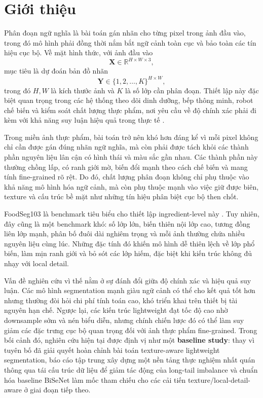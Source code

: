 \section{Giới thiệu}

Phân đoạn ngữ nghĩa là bài toán gán nhãn cho từng pixel trong ảnh đầu vào, trong đó mô hình phải đồng thời nắm bắt ngữ cảnh toàn cục và bảo toàn các tín hiệu cục bộ. Về mặt hình thức, với ảnh đầu vào
\[
\mathbf{X} \in \mathbb{R}^{H \times W \times 3},
\]
mục tiêu là dự đoán bản đồ nhãn
\[
\mathbf{Y} \in \{1,2,\dots,K\}^{H \times W},
\]
trong đó $H, W$ là kích thước ảnh và $K$ là số lớp cần phân đoạn. Thiết lập này đặc biệt quan trọng trong các hệ thống theo dõi dinh dưỡng, bếp thông minh, robot chế biến và kiểm soát chất lượng thực phẩm, nơi yêu cầu về độ chính xác phải đi kèm với khả năng suy luận hiệu quả trong thực tế \cite{mahalik2010trends, stemmer2018vision, gao2019smartfridge, wang2019smartrefrigerator}.

Trong miền ảnh thực phẩm, bài toán trở nên khó hơn đáng kể vì mỗi pixel không chỉ cần được gán đúng nhãn ngữ nghĩa, mà còn phải được tách khỏi các thành phần nguyên liệu lân cận có hình thái và màu sắc gần nhau. Các thành phần này thường chồng lấp, có ranh giới mờ, biến đổi mạnh theo cách chế biến và mang tính fine-grained rõ rệt. Do đó, chất lượng phân đoạn không chỉ phụ thuộc vào khả năng mô hình hóa ngữ cảnh, mà còn phụ thuộc mạnh vào việc giữ được biên, texture và cấu trúc bề mặt như những tín hiệu phân biệt cục bộ then chốt.

FoodSeg103 là benchmark tiêu biểu cho thiết lập ingredient-level này \cite{benchmarkfood}. Tuy nhiên, đây cũng là một benchmark khó: số lớp lớn, biến thiên nội lớp cao, tương đồng liên lớp mạnh, phân bố đuôi dài nghiêm trọng và mỗi ảnh thường chứa nhiều nguyên liệu cùng lúc. Những đặc tính đó khiến mô hình dễ thiên lệch về lớp phổ biến, làm mịn ranh giới và bỏ sót các lớp hiếm, đặc biệt khi kiến trúc không đủ nhạy với local detail.

Vấn đề nghiên cứu vì thế nằm ở sự đánh đổi giữa độ chính xác và hiệu quả suy luận. Các mô hình segmentation mạnh giàu ngữ cảnh có thể cho kết quả tốt hơn nhưng thường đòi hỏi chi phí tính toán cao, khó triển khai trên thiết bị tài nguyên hạn chế. Ngược lại, các kiến trúc lightweight đạt tốc độ cao nhờ downsample sớm và nén biểu diễn, nhưng chính chiến lược đó có thể làm suy giảm các đặc trưng cục bộ quan trọng đối với ảnh thực phẩm fine-grained. Trong bối cảnh đó, nghiên cứu hiện tại được định vị như một \textbf{baseline study}: thay vì tuyên bố đã giải quyết hoàn chỉnh bài toán texture-aware lightweight segmentation, báo cáo tập trung xây dựng một nền tảng thực nghiệm nhất quán thông qua tái cấu trúc dữ liệu để giảm tác động của long-tail imbalance và chuẩn hóa baseline BiSeNet làm mốc tham chiếu cho các cải tiến texture/local-detail-aware ở giai đoạn tiếp theo.

